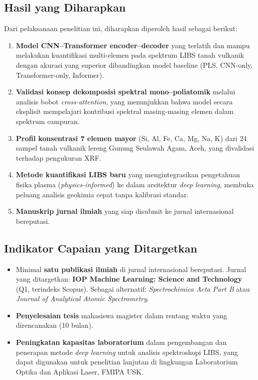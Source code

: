 \documentclass[12pt, a4paper]{article}
\begin{document}
\subsection{Hasil yang Diharapkan}

Dari pelaksanaan penelitian ini, diharapkan diperoleh hasil sebagai berikut:
\begin{enumerate}[label=\arabic*., leftmargin=2cm]
    \item \textbf{Model CNN--Transformer encoder--decoder} yang terlatih dan mampu melakukan kuantifikasi multi-elemen pada spektrum LIBS tanah vulkanik dengan akurasi yang superior dibandingkan model baseline (PLS, CNN-only, Transformer-only, Informer).
    \item \textbf{Validasi konsep dekomposisi spektral mono--poliatomik} melalui analisis bobot \textit{cross-attention}, yang menunjukkan bahwa model secara eksplisit mempelajari kontribusi spektral masing-masing elemen dalam spektrum campuran.
    \item \textbf{Profil konsentrasi 7 elemen mayor} (Si, Al, Fe, Ca, Mg, Na, K) dari 24 sampel tanah vulkanik lereng Gunung Seulawah Agam, Aceh, yang divalidasi terhadap pengukuran XRF.
    \item \textbf{Metode kuantifikasi LIBS baru} yang mengintegrasikan pengetahuan fisika plasma (\textit{physics-informed}) ke dalam arsitektur \textit{deep learning}, membuka peluang analisis geokimia cepat tanpa kalibrasi standar.
    \item \textbf{Manuskrip jurnal ilmiah} yang siap disubmit ke jurnal internasional bereputasi.
\end{enumerate}


\subsection{Indikator Capaian yang Ditargetkan}

\begin{itemize}[leftmargin=2cm]
    \item Minimal \textbf{satu publikasi ilmiah} di jurnal internasional bereputasi. Jurnal yang ditargetkan: \textbf{IOP Machine Learning: Science and Technology} (Q1, terindeks Scopus). Sebagai alternatif: \textit{Spectrochimica Acta Part B} atau \textit{Journal of Analytical Atomic Spectrometry}.
    \item \textbf{Penyelesaian tesis} mahasiswa magister dalam rentang waktu yang direncanakan (10 bulan).
    \item \textbf{Peningkatan kapasitas laboratorium} dalam pengembangan dan penerapan metode \textit{deep learning} untuk analisis spektroskopi LIBS, yang dapat digunakan untuk penelitian lanjutan di lingkungan Laboratorium Optika dan Aplikasi Laser, FMIPA USK.
\end{itemize}
\end{document}
